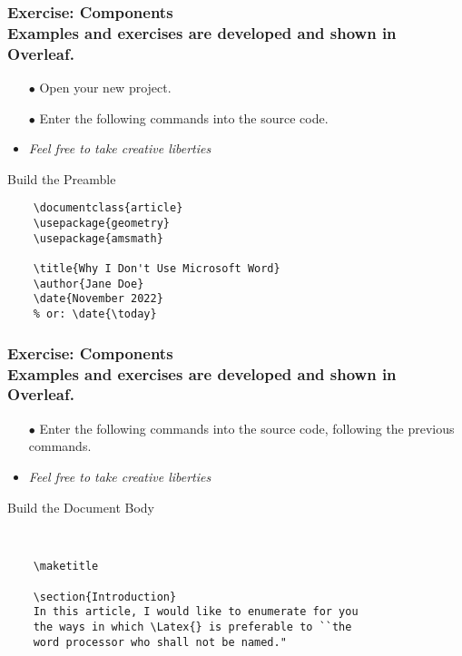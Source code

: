 
\begin{frame}[fragile]
\frametitle{Exercise: Components \\
{\small Examples and exercises are developed and shown in Overleaf.}} 
\begin{itemize}
    \item[$\bullet$] Open your new project.
    \item[$\bullet$] Enter the following commands into the source code. 
    \item {\small \textit{Feel free to take creative liberties}} 
\end{itemize}
\begin{alertblock}{Build the Preamble}
    \small
    \begin{verbatim}
    \documentclass{article}
    \usepackage{geometry}
    \usepackage{amsmath}
    
    \title{Why I Don't Use Microsoft Word}
    \author{Jane Doe}
    \date{November 2022}
    % or: \date{\today}
    \end{verbatim}
\end{alertblock}

\end{frame}


\begin{frame}[fragile]
\frametitle{Exercise: Components \\
{\small Examples and exercises are developed and shown in Overleaf.}} 
\begin{itemize}
    \item[$\bullet$] Enter the following commands into the source code, following the previous commands. 
    \item {\small \textit{Feel free to take creative liberties}} 
\end{itemize}
\begin{alertblock}{Build the Document Body}
    \small
    \begin{verbatim}
    
    
    \maketitle
    
    \section{Introduction}
    In this article, I would like to enumerate for you 
    the ways in which \Latex{} is preferable to ``the 
    word processor who shall not be named."
    
    
    \end{verbatim}
\end{alertblock}

\end{frame}


